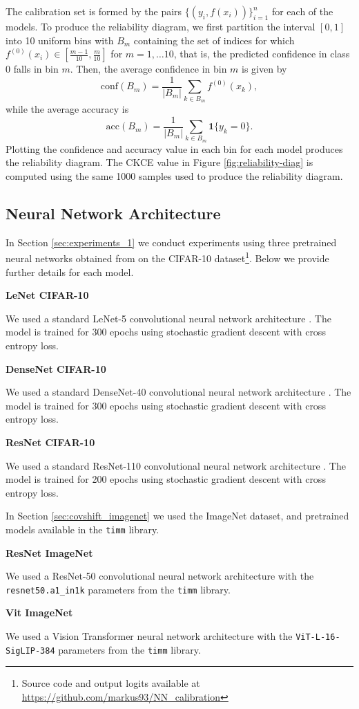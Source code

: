 \documentclass[twocolumn]{article}
\theoremstyle{definition}
\begin{document}
The calibration set is formed by the pairs $\{ (y_i, f(x_i) )\}_{i=1}^n$ for each of the models. To produce the reliability diagram, we first partition the interval $[0,1]$ into 10 uniform bins with $B_m$ containing the set of indices for which $f^{(0)}(x_i) \in [\frac{m-1}{10}, \frac{m}{10}]$ for $m = 1, \dots 10$, that is, the predicted confidence in class 0 falls in bin $m$. Then, the average confidence in bin $m$ is given by
\begin{equation*}
    \text{conf}(B_m) = \frac{1}{|B_m|} \sum_{k\in B_m} f^{(0)}(x_k),
\end{equation*}
while the average accuracy is
\begin{equation*}
    \text{acc}(B_m) =  \frac{1}{|B_m|} \sum_{k\in B_m} \mathbf{1}\{ y_k = 0 \}.
\end{equation*}
Plotting the confidence and accuracy value in each bin for each model produces the reliability diagram. The CKCE value in Figure \ref{fig:reliability-diag} is computed using the same 1000 samples used to produce the reliability diagram.


\subsection{Neural Network Architecture} \label{Ap:nna}

In Section \ref{sec:experiments_1} we conduct experiments using three pretrained neural networks obtained from \citet{Kull_2019} on the CIFAR-10 dataset\footnote{Source code and output logits available at \url{https://github.com/markus93/NN_calibration}}. Below we provide further details for each model.

\textbf{LeNet CIFAR-10}

We used a standard LeNet-5 convolutional neural network architecture \citep{Lecun_1998}. The model is trained for 300 epochs using stochastic gradient descent with cross entropy loss. 

\textbf{DenseNet CIFAR-10}

We used a standard DenseNet-40 convolutional neural network architecture \citep{Huang_2018denselyconnectedconvolutionalnetworks}. The model is trained for 300 epochs using stochastic gradient descent with cross entropy loss. 

\textbf{ResNet CIFAR-10}

We used a standard ResNet-110 convolutional neural network architecture \citep{He_2015deepresiduallearningimage}. The model is trained for 200 epochs using stochastic gradient descent with cross entropy loss. 


In Section \ref{sec:covshift_imagenet} we used the ImageNet dataset, and pretrained models available in the \texttt{timm} library. 

\textbf{ResNet ImageNet}

We used a ResNet-50 convolutional neural network architecture \citep{He_2015deepresiduallearningimage} with the \texttt{resnet50.a1\_in1k} parameters from the \texttt{timm} library.

\textbf{Vit ImageNet}

We used a Vision Transformer neural network architecture \citep{zhai2023sigmoidlosslanguageimage} with the \texttt{ViT-L-16-SigLIP-384} parameters from the \texttt{timm} library.
\end{document}
